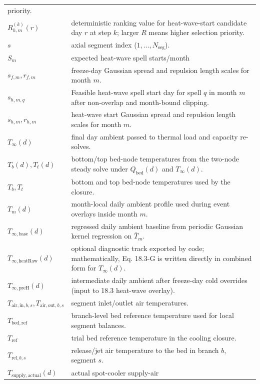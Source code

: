 {\begin{longtable}[]{@{}
  >{\raggedright\arraybackslash}p{}
  >{\raggedright\arraybackslash}p{}@{}}
priority. \\
\(R_{h,m}^{(k)}(r)\) & deterministic ranking value for heat-wave-start
candidate day \(r\) at step \(k\); larger \(R\) means higher selection
priority. \\
\(s\) & axial segment index (\(1,\dots,N_{\mathrm{seg}}\)). \\
\(S_m\) & expected heat-wave spell starts/month \\
\(s_{f,m},r_{f,m}\) & freeze-day Gaussian spread and repulsion length
scales for month \(m\). \\
\(s_{h,m,q}\) & Feasible heat-wave spell start day for spell \(q\) in
month \(m\) after non-overlap and month-bound clipping. \\
\(s_{h,m},r_{h,m}\) & heat-wave start Gaussian spread and repulsion
length scales for month \(m\). \\
\(T_\infty(d)\) & final day ambient passed to thermal load and capacity
re-solves. \\
\(T_b(d),T_t(d)\) & bottom/top bed-node temperatures from the two-node
steady solve under \(Q_{\mathrm{bed}}(d)\) and \(T_\infty(d)\). \\
\(T_b,T_t\) & bottom and top bed-node temperatures used by the
closure. \\
\(T_m(d)\) & month-local daily ambient profile used during event
overlays inside month \(m\). \\
\(T_{\infty,\mathrm{base}}(d)\) & regressed daily ambient baseline from
periodic Gaussian kernel regression on \(\bar T_m\). \\
\(T_{\infty,\mathrm{heatRaw}}(d)\) & optional diagnostic track exported
by code; mathematically, Eq. 18.3-G is written directly in combined form
for \(T_\infty(d)\). \\
\(T_{\infty,\mathrm{preH}}(d)\) & intermediate daily ambient after
freeze-day cold overrides (input to 18.3 heat-wave overlay). \\
\(T_{\mathrm{air,in},b,s},T_{\mathrm{air,out},b,s}\) & segment
inlet/outlet air temperatures. \\
\(T_{\mathrm{bed,ref}}\) & branch-level bed reference temperature used
for local segment balances. \\
\(T_{\mathrm{ref}}\) & trial bed reference temperature in the cooling
closure. \\
\(T_{\mathrm{rel},b,s}\) & release/jet air temperature to the bed in
branch \(b\), segment \(s\). \\
\(T_{\mathrm{supply,actual}}(d)\) & actual spot-cooler supply-air

\end{longtable}}
